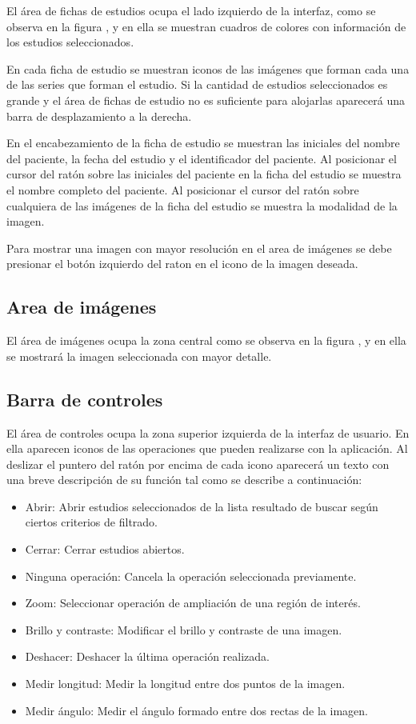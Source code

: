 \documentclass{plantilla-manual-usuario}
\begin{document}
El área de fichas de estudios ocupa el lado izquierdo de la interfaz, como se observa en la figura , y en ella se muestran cuadros de colores con información de los estudios seleccionados. 

En cada ficha de estudio se muestran iconos de las imágenes que forman cada una de las series que forman el estudio. Si la cantidad de estudios seleccionados es grande y el área de fichas de estudio no es suficiente para alojarlas aparecerá una barra de desplazamiento a la derecha.

En el encabezamiento de la ficha de estudio se muestran las iniciales del nombre del paciente, la fecha del estudio y el identificador del paciente. Al posicionar el cursor del ratón sobre las iniciales del paciente en la ficha del estudio se muestra el nombre completo del paciente. Al posicionar el cursor del ratón sobre cualquiera de las imágenes de la ficha del estudio se muestra la modalidad de la imagen.

Para mostrar una imagen con mayor resolución en el area de imágenes se debe presionar el botón izquierdo del raton en el icono de la imagen deseada. 

\subsection{Area de imágenes}\label{sectionAreadeImagenes}

El área de imágenes ocupa la zona central como se observa en la figura  , y en ella se mostrará la imagen seleccionada con mayor detalle. 

\subsection{Barra de controles}\label{sectionBarradeControles}

El área de controles ocupa la zona superior izquierda de la interfaz de usuario. En ella aparecen iconos de las operaciones que pueden realizarse con la aplicación. Al deslizar el puntero del ratón por encima de cada icono aparecerá un texto con una breve descripción de su función tal como se describe a continuación:

\begin{itemize}
\item Abrir: Abrir estudios seleccionados de la lista resultado de buscar según ciertos criterios de filtrado.
\item Cerrar: Cerrar estudios abiertos.
\item Ninguna operación: Cancela la operación seleccionada previamente.
\item Zoom: Seleccionar operación de ampliación de una región de interés.
\item Brillo y contraste: Modificar el brillo y contraste de una imagen.
\item Deshacer: Deshacer la última operación realizada.
\item Medir longitud: Medir la longitud entre dos puntos de la imagen. 
\item Medir ángulo: Medir el ángulo formado entre dos rectas de la imagen. 
\end{itemize}
\end{document}

